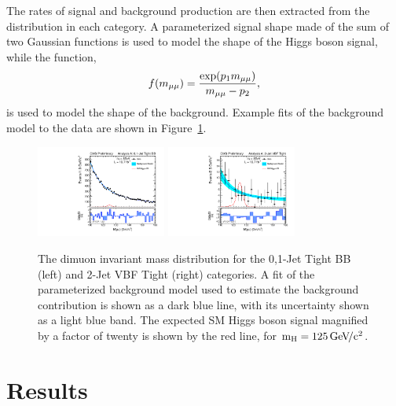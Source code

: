\documentclass[10pt]{article}
\begin{document}
The rates of signal and background production are then extracted from the 
\Mmumu{} distribution 
in each category.  A parameterized signal shape made of the sum of
two Gaussian functions is used to model the shape of the Higgs boson signal, while
the function,
\begin{equation}
f(m_{\mu\mu}{}) = \frac{\exp(p_1 m_{\mu\mu}{})}{m_{\mu\mu}{}-p_2},
\end{equation}
is used to model the shape of the background.
Example fits of the background model to the data are shown in Figure~\ref{fig:mass}.

\begin{figure}[htb]
\centering
\includegraphics[width=0.38\textwidth]{plotsPublic/mass_AnanlysisA/pdf/CombSplitAll_8TeV_125_Jets01PassPtG10BB.pdf}
\includegraphics[width=0.38\textwidth]{plotsPublic/mass_AnanlysisA/pdf/CombSplitAll_8TeV_125_Jet2CutsVBFPass.pdf}
\caption{ The dimuon invariant mass distribution for the 0,1-Jet Tight BB (left) and 2-Jet VBF Tight (right) categories.
            A fit of the parameterized background model used to estimate the background contribution is shown
            as a dark blue line, with its uncertainty shown as a light blue band.  The expected SM Higgs boson
            signal magnified by a factor of twenty is shown by the red line, for $\mathrm{m_H}{}=125\,\mathrm{Ge\kern -0.1em V\!/c^2}{}$.
            }
\label{fig:mass}
\end{figure}

\section{Results}
\end{document}
